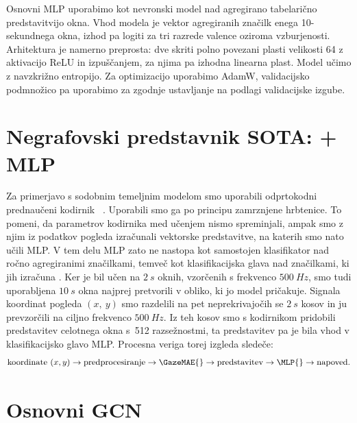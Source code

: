Osnovni MLP uporabimo kot nevronski model nad agregirano tabelarično predstavitvijo okna.
Vhod modela je vektor agregiranih značilk enega 10-sekundnega okna, izhod pa logiti za tri razrede valence oziroma vzburjenosti.
Arhitektura je namerno preprosta: dve skriti polno povezani plasti velikosti 64 z aktivacijo ReLU in izpuščanjem, za njima pa izhodna linearna plast.
Model učimo z navzkrižno entropijo.
Za optimizacijo uporabimo AdamW, validacijsko podmnožico pa uporabimo za zgodnje ustavljanje na podlagi validacijske izgube.



\section{Negrafovski predstavnik SOTA: \GazeMAE{} + MLP}
\label{subsec:gazemae-model}

Za primerjavo s sodobnim temeljnim modelom smo uporabili odprtokodni prednaučeni kodirnik \GazeMAE{}~\cite{bautista2021gazemae}.
Uporabili smo ga po principu zamrznjene hrbtenice. To pomeni, da parametrov kodirnika med učenjem nismo spreminjali, ampak smo z njim iz podatkov pogleda izračunali vektorske predstavitve, na katerih smo nato učili MLP.
V tem delu MLP zato ne nastopa kot samostojen klasifikator nad ročno agregiranimi značilkami, temveč kot klasifikacijska glava nad značilkami, ki jih izračuna \GazeMAE{}.
Ker je bil \GazeMAE{} učen na $2~s$ oknih, vzorčenih s frekvenco $500~Hz$, smo tudi uporabljena $10~s$ okna najprej pretvorili v obliko, ki jo model pričakuje. Signala koordinat pogleda $(x,~y)$ smo razdelili na pet neprekrivajočih se $2~s$ kosov in ju prevzorčili na ciljno frekvenco $500~Hz$.
Iz teh kosov smo s kodirnikom pridobili predstavitev celotnega okna s~512 razsežnostmi, ta predstavitev pa je bila vhod v klasifikacijsko glavo MLP.
Procesna veriga torej izgleda sledeče:
\begin{equation}
    \text{koordinate } (x, y) \rightarrow \text{predprocesiranje} \rightarrow \GazeMAE{} \rightarrow \text{predstavitev} \rightarrow \MLP{} \rightarrow \text{napoved}.
\end{equation}
  
 
\section{Osnovni GCN}
\label{subsec:gnn-baselines}


